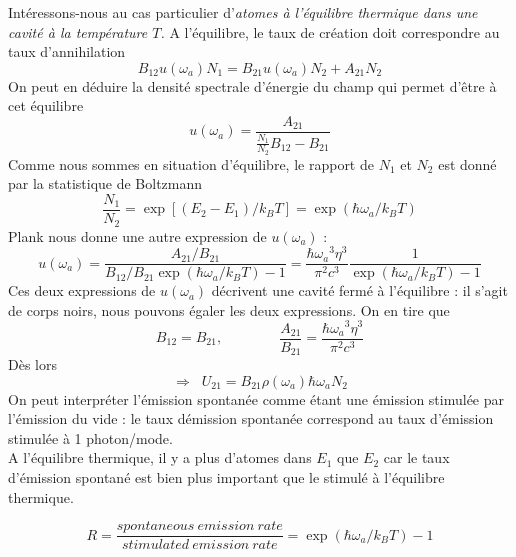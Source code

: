 	Intéressons-nous au cas particulier d'\textit{atomes à l'équilibre thermique dans une cavité 
	à la température $T$.} A l'équilibre, le taux de création doit correspondre au taux d'annihilation
	\begin{equation}
	{B_{12}}u({\omega _a}){N_1} = {B_{21}}u({\omega _a}){N_2} + {A_{21}}{N_2}
	\end{equation}
	On peut en déduire la densité spectrale d'énergie du champ qui permet d'être à cet équilibre
	\begin{equation}
	u({\omega _a}) = \frac{{{A_{21}}}}{{\frac{{{N_1}}}{{{N_2}}}{B_{12}} - {B_{21}}}}
	\end{equation}
	Comme nous sommes en situation d'équilibre, le rapport de $N_1$ et $N_2$ est donné par la 
	statistique de Boltzmann
	\begin{equation}
	\frac{{{N_1}}}{{{N_2}}} = \exp [({E_2} - {E_1})/{k_B}T] = \exp (\hbar {\omega _a}/{k_B}T)
	\end{equation}
	Plank nous donne une autre expression de $u(\omega_a)$ :
	\begin{equation}
	u({\omega _a}) = \frac{{{A_{21}}/{B_{21}}}}{{{B_{12}}/{B_{21}}\exp (\hbar {\omega _a}/{k_B}T) - 1}} = \frac{{\hbar {\omega _a}^3{\eta ^3}}}{{{\pi ^2}{c^3}}}\frac{1}{{\exp (\hbar {\omega _a}/{k_B}T) - 1}}
	\end{equation}
	Ces deux expressions de $u(\omega_a)$ décrivent une cavité fermé à l'équilibre : il s'agit de 
	corps noirs, nous pouvons égaler les deux expressions. On en tire que 
	\begin{equation}
	B_{12} = B_{21},\qquad\qquad \frac{{{A_{21}}}}{{{B_{21}}}} = \frac{{\hbar {\omega _a}^3{\eta ^3}}}
	{{{\pi ^2}{c^3}}}
	\end{equation}
	Dès lors
	\begin{equation}
	\Rightarrow \;\;{U_{21}} = {B_{21}}\rho ({\omega _a})\hbar {\omega _a}{N_2}
	\end{equation}
	On peut interpréter l'émission spontanée comme étant une émission stimulée par l'émission du vide : le taux démission spontanée correspond au taux d'émission stimulée à 1 photon/mode.\\
	
	A l'équilibre thermique, il y a plus d'atomes dans $E_1$ que $E_2$ car le taux d'émission spontané est bien plus important que le stimulé à l'équilibre thermique.
	
	\begin{equation}
	R = \frac{{spontaneous\ emission\ rate}}{{stimulated\ emission\ rate}} = \exp (\hbar {\omega _a}/{k_B}T) - 1
	\end{equation}
	
